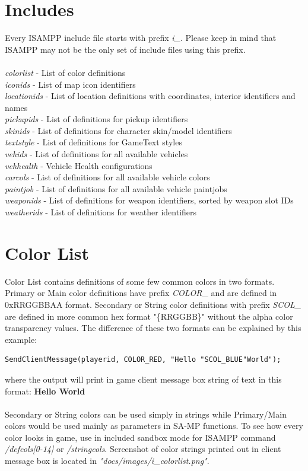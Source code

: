 \documentclass{article}
\begin{document}
\section{Includes}
Every ISAMPP include file starts with prefix \textit{i\_}. Please keep in mind that ISAMPP may not be the only set of include files using this prefix.
\\
\\
\textit{colorlist} - List of color definitions
\\
\textit{iconids} - List of map icon identifiers
\\
\textit{locationids} - List of location definitions with coordinates, interior identifiers and names
\\
\textit{pickupids} - List of definitions for pickup identifiers
\\
\textit{skinids} - List of definitions for character skin/model identifiers
\\
\textit{textstyle} - List of definitions for GameText styles
\\
\textit{vehids} - List of definitions for all available vehicles
\\
\textit{vehhealth} - Vehicle Health configurations
\\
\textit{carcols} - List of definitions for all available vehicle colors
\\
\textit{paintjob} - List of definitions for all available vehicle paintjobs
\\
\textit{weaponids} - List of definitions for weapon identifiers, sorted by weapon slot IDs
\\
\textit{weatherids} - List of definitions for weather identifiers


\newpage
\section{Color List}
Color List contains definitions of some few common colors in two formats. Primary or Main color definitions have prefix \textit{COLOR\_} and are defined in 0xRRGGBBAA format. Secondary or String color definitions with prefix \textit{SCOL\_} are defined in more common hex format "\{RRGGBB\}" without the alpha color transparency values. The difference of these two formats can be explained by this example:
\begin{verbatim}
SendClientMessage(playerid, COLOR_RED, "Hello "SCOL_BLUE"World");
\end{verbatim}
where the output will print in game client message box string of text in this format:
\textbf{\color{red}Hello \color{blue}World}\\
\\
Secondary or String colors can be used simply in strings while Primary/Main colors would be used mainly as parameters in SA-MP functions. To see how every color looks in game, use in included sandbox mode for ISAMPP command \textit{/defcols[0-14]} or \textit{/stringcols}. Screenshot of color strings printed out in client message box is located in \textit{"docs/images/i\_colorlist.png"}.
\end{document}
